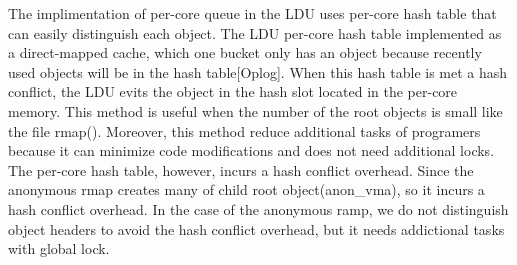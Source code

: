 The implimentation of per-core queue in the LDU uses per-core hash table that 
can easily distinguish each object.
The LDU per-core hash table implemented as a direct-mapped cache, which one
bucket only has an object because recently used objects will be in the hash
table[Oplog].
When this hash table is met a hash conflict, the LDU evits the object in the
hash slot located in the per-core memory.
This method is useful when the number of the root objects is small like the file
rmap().
Moreover, this method reduce additional tasks of programers because it can
minimize code modifications and does not need additional locks.
The per-core hash table, however, incurs a hash conflict overhead.
Since the anonymous rmap creates many of child root object(anon\_vma), so it
incurs a hash conflict overhead.
In the case of the anonymous ramp, we do not distinguish object headers to
avoid the hash conflict overhead, but it needs addictional tasks with global
lock.
